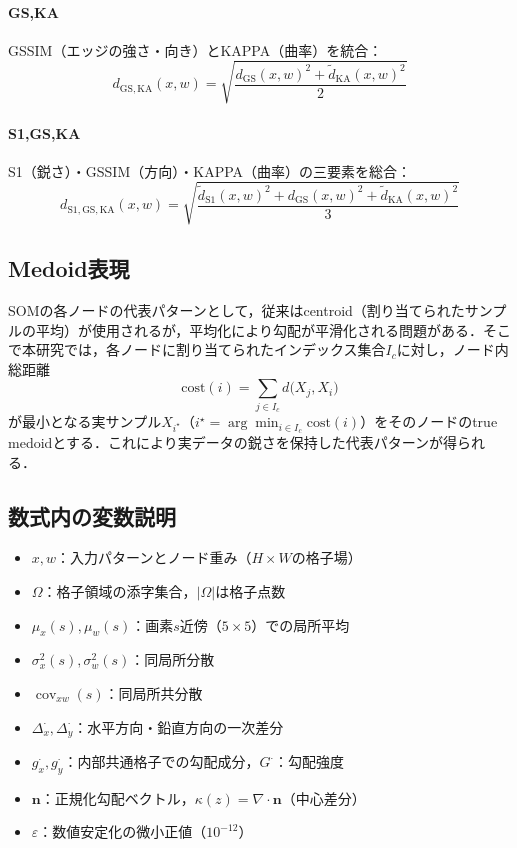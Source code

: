 \documentclass{jarticle}
\theoremstyle{definition}
\begin{document}
\paragraph{GS,KA}
GSSIM（エッジの強さ・向き）とKAPPA（曲率）を統合：
\begin{equation}
d_{\mathrm{GS,KA}}(x,w)=\sqrt{\frac{d_{\mathrm{GS}}(x,w)^2+\tilde d_{\mathrm{KA}}(x,w)^2}{2}}
\end{equation}

\paragraph{S1,GS,KA}
S1（鋭さ）・GSSIM（方向）・KAPPA（曲率）の三要素を総合：
\begin{equation}
d_{\mathrm{S1,GS,KA}}(x,w)=\sqrt{\frac{\tilde d_{\mathrm{S1}}(x,w)^2+d_{\mathrm{GS}}(x,w)^2+\tilde d_{\mathrm{KA}}(x,w)^2}{3}}
\end{equation}

\subsection{Medoid表現}
SOMの各ノードの代表パターンとして，従来はcentroid（割り当てられたサンプルの平均）が使用されるが，平均化により勾配が平滑化される問題がある．そこで本研究では，各ノードに割り当てられたインデックス集合$I_c$に対し，ノード内総距離
\begin{equation}
\mathrm{cost}(i)=\sum_{j\in I_c} d\bigl(X_j, X_i\bigr)
\end{equation}
が最小となる実サンプル$X_{i^\star}$（$i^\star=\arg\min_{i\in I_c}\mathrm{cost}(i)$）をそのノードのtrue medoidとする．これにより実データの鋭さを保持した代表パターンが得られる．

\subsection*{数式内の変数説明}
\begin{itemize}
\item $x,w$：入力パターンとノード重み（$H\times W$の格子場）
\item $\Omega$：格子領域の添字集合，$|\Omega|$は格子点数
\item $\mu_x(s),\mu_w(s)$：画素$s$近傍（$5\times 5$）での局所平均
\item $\sigma_x^2(s),\sigma_w^2(s)$：同局所分散
\item $\operatorname{cov}_{xw}(s)$：同局所共分散
\item $\Delta_x^\cdot,\Delta_y^\cdot$：水平方向・鉛直方向の一次差分
\item $g_x^\cdot,g_y^\cdot$：内部共通格子での勾配成分，$G^\cdot$：勾配強度
\item $\bm{n}$：正規化勾配ベクトル，$\kappa(z)=\nabla\cdot\bm{n}$（中心差分）
\item $\varepsilon$：数値安定化の微小正値（$10^{-12}$）
\end{itemize}
\end{document}

